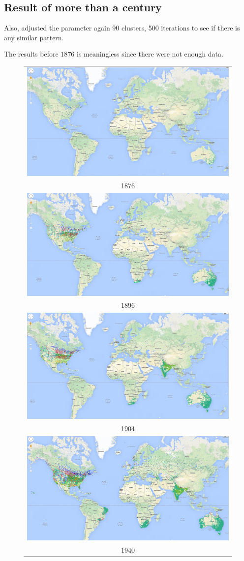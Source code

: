 \subsection{Result of more than a century}

Also, adjusted the parameter again 90 clusters, 500 iterations to see if there is any similar pattern.

The results before $1876$ is meaningless since there were not enough data.
\begin{figure}
    \centering
    \begin{tabular}{c}
        \includegraphics[width =.65\linewidth]{images/1876.png}\\ 1876\\
        \includegraphics[width =.65\linewidth]{images/1896.png}\\ 1896\\
        \includegraphics[width =.65\linewidth]{images/1904.png}\\ 1904\\
        \includegraphics[width =.65\linewidth]{images/1940.png}\\ 1940\\

\end{tabular}
\end{figure}

